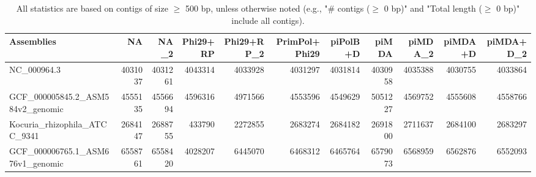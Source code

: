 \documentclass[12pt,a4paper]{article}
\begin{document}
\begin{table}[ht]
\begin{center}
\caption{All statistics are based on contigs of size $\geq$ 500 bp, unless otherwise noted (e.g., "\# contigs ($\geq$ 0 bp)" and "Total length ($\geq$ 0 bp)" include all contigs).}
\begin{tabular}{|l*{10}{|r}|}
\hline
Assemblies & NA & NA\_2 & Phi29+RP & Phi29+RP\_2 & PrimPol+Phi29 & piPolB+D & piMDA & piMDA\_2 & piMDA+D & piMDA+D\_2 \\ \hline
NC\_000964.3 & 4031037 & 4031261 & 4043314 & 4033928 & 4031297 & 4031814 & 4030958 & 4035388 & 4030755 & 4033864 \\ \hline
GCF\_000005845.2\_ASM584v2\_genomic & 4555135 & 4556694 & 4596316 & 4971566 & 4553596 & 4549629 & 5051227 & 4569752 & 4555608 & 4558766 \\ \hline
Kocuria\_rhizophila\_ATCC\_9341 & 2684147 & 2688755 & 433790 & 2272855 & 2683274 & 2684182 & 2691800 & 2711637 & 2684100 & 2683297 \\ \hline
GCF\_000006765.1\_ASM676v1\_genomic & 6558761 & 6558420 & 4028207 & 6445070 & 6468312 & 6465764 & 6579073 & 6568959 & 6562876 & 6552093 \\ \hline
\end{tabular}
\end{center}
\end{table}
\end{document}

